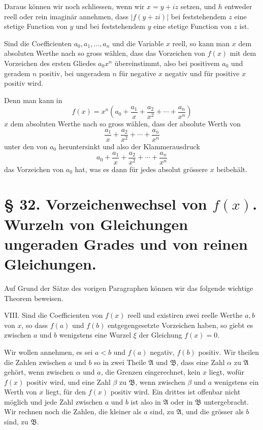 \documentclass[11pt]{article}
\begin{document}
Daraus können wir noch schliessen, wenn wir $x=y+iz$ setzen, und $h$ entweder reell oder rein imaginär annehmen, dass $|f(y+zi)|$ bei feststehendem $z$ eine stetige Function von $y$ und bei feststehendem $y$ eine stetige Function von $z$ ist.

Sind die Coefficienten $a_0,a_1,\ldots,a_n$ und die Variable $x$ reell, so kann man $x$ dem absoluten Werthe nach so gross wählen, dass das Vorzeichen von $f(x)$ mit dem Vorzeichen des ersten Gliedes $a_0x^n$ übereinstimmt, also bei positivem $a_0$ und geradem $n$ positiv, bei ungeradem $n$ für negative $x$ negativ und für positive $x$ positiv wird.

Denn man kann in
\[
 f(x)=x^n\left(a_0+\frac{a_1}{x}+\frac{a_2}{x^2}+\cdots+\frac{a_n}{x^n}\right)
\]
$x$ dem absoluten Werthe nach so gross wählen, dass der absolute Werth von
\[
 \frac{a_1}{x}+\frac{a_2}{x^2}+\cdots+\frac{a_n}{x^n}
\]
unter den von $a_0$ heruntersinkt und also der Klammerausdruck
\[
 a_0+\frac{a_1}{x}+\frac{a_2}{x^2}+\cdots+\frac{a_n}{x^n}
\]
das Vorzeichen von $a_0$ hat, was es dann für jedes absolut grössere $x$ beibehält.

\section*{§ 32. Vorzeichenwechsel von $f(x)$. Wurzeln von Gleichungen ungeraden Grades und von reinen Gleichungen.}

Auf Grund der Sätze des vorigen Paragraphen können wir das folgende wichtige Theorem beweisen.

\medskip
\noindent VIII. Sind die Coefficienten von $f(x)$ reell und existiren zwei reelle Werthe $a,b$ von $x$, so dass $f(a)$ und $f(b)$ entgegengesetzte Vorzeichen haben, so giebt es zwischen $a$ und $b$ wenigstens eine Wurzel $\xi$ der Gleichung $f(x)=0$.
\medskip

Wir wollen annehmen, es sei $a<b$ und $f(a)$ negativ, $f(b)$ positiv. Wir theilen die Zahlen zwischen $a$ und $b$ so in zwei Theile $\mathfrak A$ und $\mathfrak B$, dass eine Zahl $\alpha$ zu $\mathfrak A$ gehört, wenn zwischen $\alpha$ und $a$, die Grenzen eingerechnet, kein $x$ liegt, wofür $f(x)$ positiv wird, und eine Zahl $\beta$ zu $\mathfrak B$, wenn zwischen $\beta$ und $a$ wenigstens ein Werth von $x$ liegt, für den $f(x)$ positiv wird. Ein drittes ist offenbar nicht möglich und jede Zahl zwischen $a$ und $b$ ist also in $\mathfrak A$ oder in $\mathfrak B$ untergebracht. Wir rechnen noch die Zahlen, die kleiner als $a$ sind, zu $\mathfrak A$, und die grösser als $b$ sind, zu $\mathfrak B$.
\end{document}
